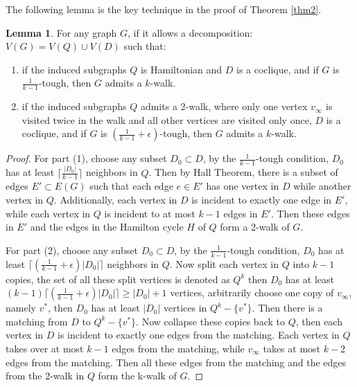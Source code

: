 \documentclass{amsart}
\theoremstyle{definition}
\newtheorem{lemma}{Lemma}
\begin{document}
The following lemma is the key technique in the proof of Theorem \ref{thm2}.

\begin{lemma}\label{addtec}
For any graph $G$, if it allows a decomposition: $V(G)=V(Q)\cup V(D)$ such that:

\begin{enumerate} 
\item if the induced subgraphs $Q$ is Hamiltonian and $D$ is a coclique, and if $G$ is $\frac{1}{k-1}$-tough, then $G$ admits a $k$-walk.
\item if the induced subgraphs $Q$ admits a 2-walk, where only one vertex $v_{\infty}$ is visited twice in the walk and all other vertices are visited only once, $D$ is a coclique, and if $G$ is $(\frac{1}{k-1}+\epsilon)$-tough, then $G$ admits a $k$-walk.

\end{enumerate}
\end{lemma}

\begin{proof}
For part (1), choose any subset $D_0\subset D$, by the $\frac{1}{k-1}$-tough condition, $D_0$ has at least $\lceil\frac{|D_0|}{k-1}\rceil$ neighbors in $Q$. Then by Hall Theorem, there is a subset of edges $E'\subset E(G)$ such that each edge $e\in E'$ has one vertex in $D$ while another vertex in $Q$. Additionally, each vertex in $D$ is incident to exactly one edge in $E'$, while each vertex in $Q$ is incident to at most $k-1$ edges in $E'$.
Then these edges in $E'$ and the edges in the Hamilton cycle $H$ of $Q$ form a 2-walk of $G$.

For part (2), choose any subset $D_0\subset D$, by the $\frac{1}{k-1}$-tough condition, $D_0$ has at least $\lceil(\frac{1}{k-1}+\epsilon)|D_0|\rceil$ neighbors in $Q$. Now split each vertex in $Q$ into $k-1$ copies, the set of all these split vertices is denoted as $Q^k$ then $D_0$ has at least $(k-1)\lceil(\frac{1}{k-1}+\epsilon)|D_0|\rceil\ge|D_0|+1$ vertices, arbitrarily choose one copy of $v_{\infty}$, namely $v^*$, then $D_0$ has at least $|D_0|$ vertices in $Q^k-\{v^*\}$. Then there is a matching from $D$ to $Q^k-\{v^*\}$. Now collapse these copies back to $Q$, then each vertex in $D$ is incident to exactly one edges from the matching. Each vertex in $Q$ takes over at most $k-1$ edges from the matching, while $v_{\infty}$ takes at most $k-2$ edges from the matching. Then all these edges from the matching and the edges from the 2-walk in $Q$ form the k-walk of $G$.
\end{proof}
\end{document}
